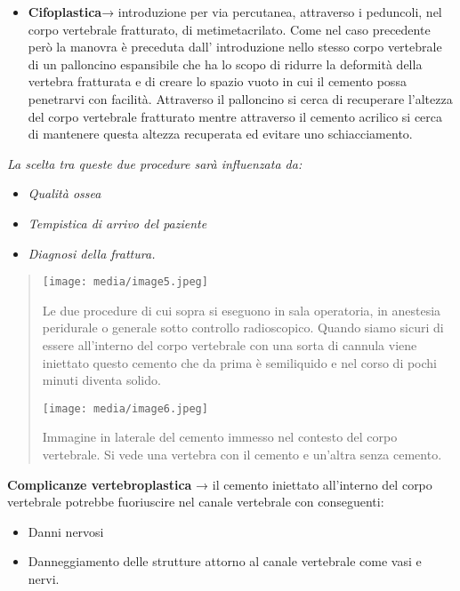 \documentclass[]{article}
\begin{document}
\begin{itemize}
\item
  \textbf{Cifoplastica}→ introduzione per via percutanea, attraverso i
  peduncoli, nel corpo vertebrale fratturato, di metimetacrilato. Come
  nel caso precedente però la manovra è preceduta dall' introduzione
  nello stesso corpo vertebrale di un palloncino espansibile che ha lo
  scopo di ridurre la deformità della vertebra fratturata e di creare lo
  spazio vuoto in cui il cemento possa penetrarvi con facilità.
  Attraverso il palloncino si cerca di recuperare l'altezza del corpo
  vertebrale fratturato mentre attraverso il cemento acrilico si cerca
  di mantenere questa altezza recuperata ed evitare uno schiacciamento.
\end{itemize}

\emph{La scelta tra queste due procedure sarà influenzata da:}

\begin{itemize}
\item
  \emph{Qualità ossea }
\item
  \emph{Tempistica di arrivo del paziente }
\item
  \emph{Diagnosi della frattura.}
\end{itemize}

\begin{quote}
\texttt{[image: media/image5.jpeg]}

Le due procedure di cui sopra si eseguono in sala operatoria, in
anestesia peridurale o generale sotto controllo radioscopico. Quando
siamo sicuri di essere all'interno del corpo vertebrale con una sorta di
cannula viene iniettato questo cemento che da prima è semiliquido e nel
corso di pochi minuti diventa solido.

\texttt{[image: media/image6.jpeg]}

Immagine in laterale del cemento immesso nel contesto del corpo
vertebrale. Si vede una vertebra con il cemento e un'altra senza
cemento.
\end{quote}

\textbf{Complicanze vertebroplastica} → il cemento iniettato all'interno
del corpo vertebrale potrebbe fuoriuscire nel canale vertebrale con
conseguenti:

\begin{itemize}
\item
  Danni nervosi
\item
  Danneggiamento delle strutture attorno al canale vertebrale come vasi
  e nervi.
\end{itemize}
\end{document}
